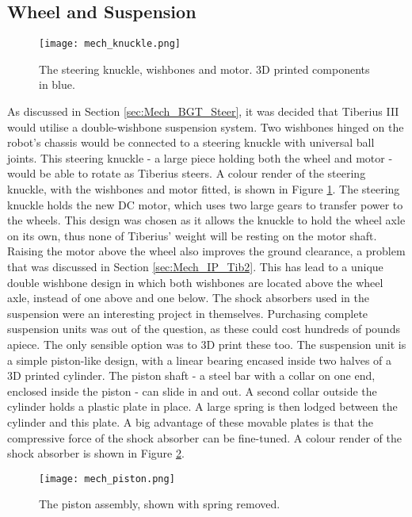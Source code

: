 \subsection{Wheel and Suspension}
\begin{figure}[!htb]
\begin{center}
\texttt{[image: mech\_knuckle.png]}
\end{center}
\caption{The steering knuckle, wishbones and motor. 3D printed components in blue.}
\label{fig:mech_knuckle}
\end{figure}
As discussed in Section \ref{sec:Mech_BGT_Steer}, it was decided that Tiberius III would utilise a double-wishbone suspension system. Two wishbones hinged on the robot's chassis would be connected to a steering knuckle with universal ball joints. This steering knuckle - a large piece holding both the wheel and motor - would be able to rotate as Tiberius steers. A colour render of the steering knuckle, with the wishbones and motor fitted, is shown in Figure \ref{fig:mech_knuckle}.
\newline
The steering knuckle holds the new DC motor, which uses two large gears to transfer power to the wheels. This design was chosen as it allows the knuckle to hold the wheel axle on its own, thus none of Tiberius' weight will be resting on the motor shaft. Raising the motor above the wheel also improves the ground clearance, a problem that was discussed in Section \ref{sec:Mech_IP_Tib2}. This has lead to a unique double wishbone design in which both wishbones are located above the wheel axle, instead of one above and one below.
\newline
The shock absorbers used in the suspension were an interesting project in themselves. Purchasing complete suspension units was out of the question, as these could cost hundreds of pounds apiece. The only sensible option was to 3D print these too.
\newline
The suspension unit  is a simple piston-like design, with a linear bearing encased inside two halves of a 3D printed cylinder. The piston shaft - a steel bar with a collar on one end, enclosed inside the piston - can slide in and out. A second collar outside the cylinder holds a plastic plate in place. A large spring is then lodged between the cylinder and this plate. A big advantage of these movable plates is that the compressive force of the shock absorber can be fine-tuned. A colour render of the shock absorber is shown in Figure \ref{fig:mech_piston}.
\begin{figure}[!htb]
\begin{center}
\texttt{[image: mech\_piston.png]}
\end{center}
\caption{The piston assembly, shown with spring removed.}
\label{fig:mech_piston}
\end{figure}

